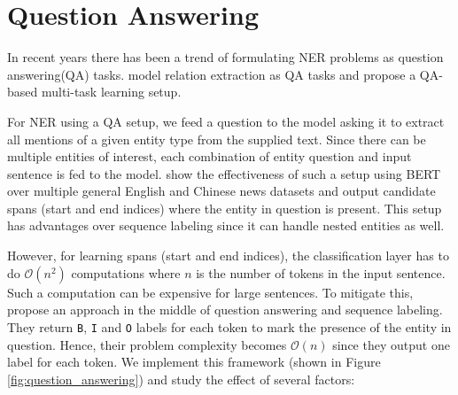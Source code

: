 \section{Question Answering}
\label{sec:question_answering}
In recent years there has been a trend of formulating NER problems as question answering(QA) tasks. \cite{li2019entity, levy2017zero} model relation extraction as QA tasks and \cite{mccann2018natural} propose a QA-based multi-task learning setup. 

For NER using a QA setup, we feed a question to the model asking it to extract all mentions of a given entity type from the supplied text. Since there can be multiple entities of interest, each combination of entity question and input sentence is fed to the model. \cite{li2019unified, li2019dice} show the effectiveness of such a setup using BERT over multiple general English and Chinese news datasets and output candidate spans (start and end indices) where the entity in question is present. This setup has advantages over sequence labeling since it can handle nested entities as well. 

However, for learning spans (start and end indices), the classification layer has to do $\mathcal{O}(n^2)$ computations where $n$ is the number of tokens in the input sentence. Such a computation can be expensive for large sentences. To mitigate this, \cite{banerjee2019knowledge} propose an approach in the middle of question answering and sequence labeling. They return \texttt{B}, \texttt{I} and \texttt{O} labels for each token to mark the presence of the entity in question. Hence, their problem complexity becomes $\mathcal{O}(n)$ since they output one label for each token. We implement this framework (shown in Figure \ref{fig:question_answering}) and study the effect of several factors:

